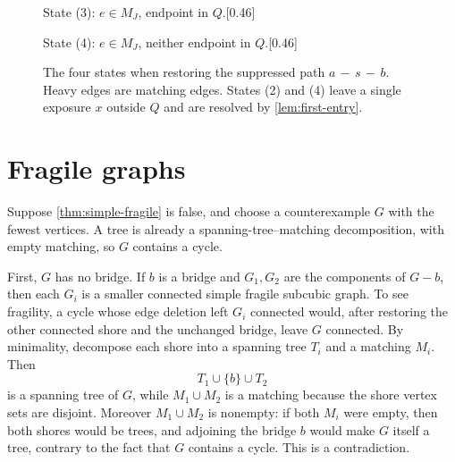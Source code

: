 \documentclass[a4paper,11pt]{article}
\numberwithin{equation}{section}
\begin{document}
\begin{figure}[ht]
  \begin{subcaptionbox}{State (3): $e\in M_J$, endpoint in $Q$.\label{fig:state3}}[0.46\linewidth]{
    }
  \end{subcaptionbox}
  \hfill
  \begin{subcaptionbox}{State (4): $e\in M_J$, neither endpoint in $Q$.\label{fig:state4}}[0.46\linewidth]{
    }
  \end{subcaptionbox}
  \caption{The four states when restoring the suppressed path $a\,{-}\,s\,{-}\,b$.
  Heavy edges are matching edges. States (2) and (4) leave a single exposure $x$
  outside $Q$ and are resolved by \cref{lem:first-entry}.}
  \label{fig:restore-states}
\end{figure}


\section{Fragile graphs}\label{sec:fragile}

Suppose \cref{thm:simple-fragile} is false, and choose a counterexample $G$ with
the fewest vertices. A tree is
already a spanning-tree--matching decomposition, with empty matching, so $G$
contains a cycle.

First, $G$ has no bridge. If $b$ is a bridge and $G_1,G_2$ are the components of
$G-b$, then each $G_i$ is a smaller connected simple fragile subcubic graph. To
see fragility, a cycle whose edge deletion left $G_i$ connected would, after
restoring the other connected shore and the unchanged bridge, leave $G$
connected. By minimality, decompose each shore into a spanning tree $T_i$ and a
matching $M_i$. Then
\[
  T_1\cup\{b\}\cup T_2
\]
is a spanning tree of $G$, while $M_1\cup M_2$ is a matching because the shore
vertex sets are disjoint. Moreover $M_1\cup M_2$ is nonempty: if both $M_i$ were
empty, then both shores would be trees, and adjoining the bridge $b$ would make
$G$ itself a tree, contrary to the fact that $G$ contains a cycle. This is a
contradiction.
\end{document}
